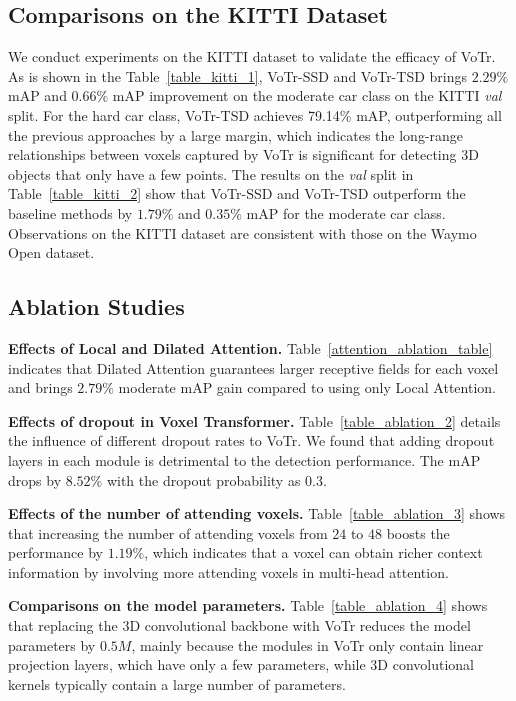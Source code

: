 \documentclass[10pt,twocolumn,letterpaper]{article}
\begin{document}
\subsection{Comparisons on the KITTI Dataset} \label{3D Detection on the KITTI Dataset} 
We conduct experiments on the KITTI dataset to validate the efficacy of VoTr. As is shown in the Table~\ref{table_kitti_1}, VoTr-SSD and VoTr-TSD brings $2.29\%$ mAP and $0.66\%$ mAP improvement on the moderate car class on the KITTI \textit{val} split. For the hard car class, VoTr-TSD achieves 79.14$\%$ mAP, outperforming all the previous approaches by a large margin, which indicates the long-range relationships between voxels captured by VoTr is significant for detecting 3D objects that only have a few points. The results on the \textit{val} split in Table~\ref{table_kitti_2} show that VoTr-SSD and VoTr-TSD outperform the baseline methods by $1.79\%$ and $0.35\%$ mAP for the moderate car class. Observations on the KITTI dataset are consistent with those on the Waymo Open dataset.


\subsection{Ablation Studies} \label{Ablation Studies}
\textbf{Effects of Local and Dilated Attention.} Table~\ref{attention_ablation_table} indicates that Dilated Attention guarantees larger receptive fields for each voxel and brings $2.79\%$ moderate mAP gain compared to using only Local Attention.

\textbf{Effects of dropout in Voxel Transformer.} Table~\ref{table_ablation_2} details the influence of different dropout rates to VoTr. We found that adding dropout layers in each module is detrimental to the detection performance. The mAP drops by $8.52\%$ with the dropout probability as $0.3$. 


\textbf{Effects of the number of attending voxels.} Table~\ref{table_ablation_3} shows that increasing the number of attending voxels from $24$ to $48$ boosts the performance by $1.19\%$, which indicates that a  voxel can obtain richer context information by involving more attending voxels in multi-head attention. 

\textbf{Comparisons on the model parameters.} Table~\ref{table_ablation_4} shows that replacing the 3D convolutional backbone with VoTr reduces the model parameters by $0.5M$, mainly because the modules in VoTr only contain linear projection layers, which have only a few parameters, while 3D convolutional kernels typically contain a large number of parameters. 
\end{document}
